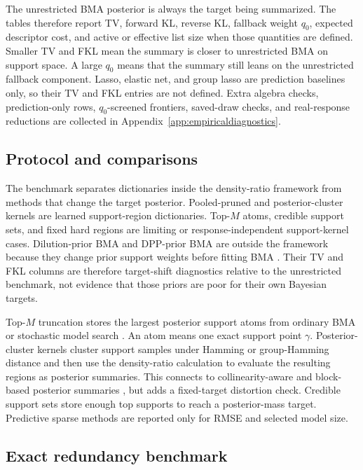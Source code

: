 \documentclass[twoside,11pt]{article}
\begin{document}
The unrestricted BMA posterior is always the target being summarized. The tables therefore report TV, forward KL, reverse KL, fallback weight \(q_0\), expected descriptor cost, and active or effective list size when those quantities are defined. Smaller TV and FKL mean the summary is closer to unrestricted BMA on support space. A large \(q_0\) means that the summary still leans on the unrestricted fallback component. Lasso, elastic net, and group lasso are prediction baselines only, so their TV and FKL entries are not defined. Extra algebra checks, prediction-only rows, \(q_0\)-screened frontiers, saved-draw checks, and real-response reductions are collected in Appendix~\ref{app:empiricaldiagnostics}.

\subsection{Protocol and comparisons}
\label{subsec:benchmarktarget}

The benchmark separates dictionaries inside the density-ratio framework from methods that change the target posterior. Pooled-pruned and posterior-cluster kernels are learned support-region dictionaries. Top-\(M\) atoms, credible support sets, and fixed hard regions are limiting or response-independent support-kernel cases. Dilution-prior BMA and DPP-prior BMA are outside the framework because they change prior support weights before fitting BMA \citep{george2010,krishna2009}. Their TV and FKL columns are therefore target-shift diagnostics relative to the unrestricted benchmark, not evidence that those priors are poor for their own Bayesian targets.

Top-\(M\) truncation stores the largest posterior support atoms from ordinary BMA or stochastic model search \citep{hoeting1999,clyde2011}. An atom means one exact support point \(\gamma\). Posterior-cluster kernels cluster support samples under Hamming or group-Hamming distance and then use the density-ratio calculation to evaluate the resulting regions as posterior summaries. This connects to collinearity-aware and block-based posterior summaries \citep{ghosh2015collinearity,papaspiliopoulos2017}, but adds a fixed-target distortion check. Credible support sets store enough top supports to reach a posterior-mass target. Predictive sparse methods are reported only for RMSE and selected model size.

\subsection{Exact redundancy benchmark}
\label{subsec:currentexactcomparison}
\end{document}
